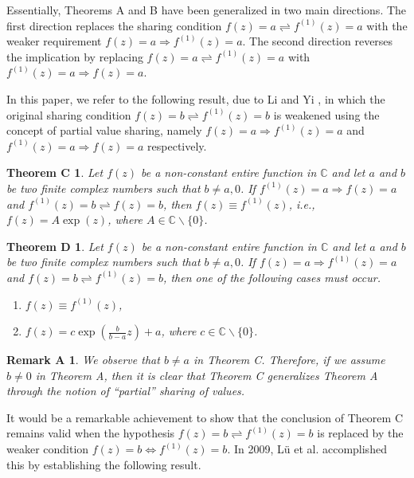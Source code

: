 \documentclass[11pt, reqno]{amsart}
\newtheorem*{theoC}{Theorem C}
\newtheorem*{theoD}{Theorem D}
\newtheorem*{remA}{Remark A}
\newtheorem*{cor A}{Corollary A}
\newtheorem*{cor B}{Corollary B}
\numberwithin{equation}{section}
\begin{document}
Essentially, Theorems A and B have been generalized in two main directions. The first direction replaces the sharing condition $f(z)=a\rightleftharpoons f^{(1)}(z)=a$ with the weaker requirement $f(z)=a\Rightarrow f^{(1)}(z)=a$. The second direction reverses the implication by replacing $f(z)=a\rightleftharpoons f^{(1)}(z)=a$ with $f^{(1)}(z)=a\Rightarrow f(z)=a.$


\smallskip
In this paper, we refer to the following result, due to Li and Yi \cite{Li-Yi-2006}, in which the original sharing condition $f(z)=b\rightleftharpoons f^{(1)}(z)=b$ is weakened using the concept of partial value sharing, namely $f(z)=a\Rightarrow f^{(1)}(z)=a$ and $f^{(1)}(z)=a\Rightarrow f(z)=a$ respectively.

\begin{theoC}\cite[Theorem 1]{Li-Yi-2006} Let $f(z)$ be a non-constant entire function in $\mathbb{C}$ and let $a$ and $b$ be two finite complex numbers such that $b\not=a,0$. If $f^{(1)}(z)=a\Rightarrow f(z)=a$ and $f^{(1)}(z)=b\rightleftharpoons f(z)=b$, then $f(z)\equiv f^{(1)}(z)$, i.e., $f(z)=A\exp(z)$, where $A\in\mathbb{C}\backslash \{0\}$.
\end{theoC} 

\begin{theoD}\cite[Theorem 2]{Li-Yi-2006} Let $f(z)$ be a non-constant entire function in $\mathbb{C}$ and let $a$ and $b$ be two finite complex numbers such that $b\not=a, 0$. If $f(z)=a\Rightarrow f^{(1)}(z)=a$ and $f(z)=b\rightleftharpoons f^{(1)}(z)=b$, then one of the following cases must occur. 
\begin{enumerate} 
\item[(1)] $f(z)\equiv f^{(1)}(z)$, 
\item[(2)] $f(z)=c\exp(\frac{b}{b-a}z)+a$, where $c\in\mathbb{C}\backslash \{0\}$. 
\end{enumerate}  
\end{theoD}

\begin{remA} We observe that $b\not=a$ in Theorem C. Therefore, if we assume $b\not=0$ in Theorem A, then it is clear that Theorem C generalizes Theorem A through the notion of ``partial'' sharing of values.
\end{remA}

It would be a remarkable achievement to show that the conclusion of Theorem C remains valid when the hypothesis $f(z)=b\rightleftharpoons f^{(1)}(z)=b$ is replaced by the weaker condition $f(z)=b\Leftrightarrow f^{(1)}(z)=b$.
In 2009, L\"{u} et al. \cite{Lu-Xu-Yi-2009} accomplished this by establishing the following result. 
\end{document}
